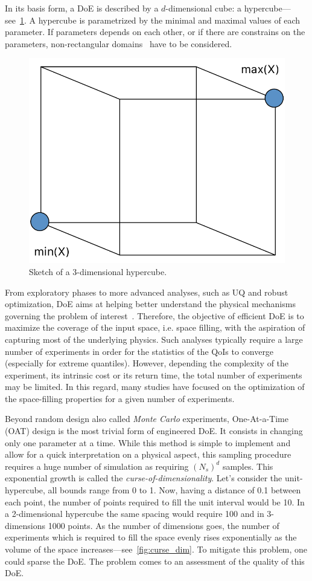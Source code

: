 In its basis form, a DoE is described by a $d$-dimensional cube: a hypercube---see~\cref{fig:sketch_hypercube}. A hypercube is parametrized by the minimal and maximal values of each parameter. If parameters depends on each other, or if there are constrains on the parameters, non-rectangular domains~\citep{Lekivetz2015} have to be considered.

\begin{figure}[!ht]
\centering
\includegraphics[width=0.5\linewidth,keepaspectratio]{fig/literature/hypercube.pdf}
\caption{Sketch of a 3-dimensional hypercube.}
\label{fig:sketch_hypercube}
\end{figure}

From exploratory phases to more advanced analyses, such as UQ and robust optimization, DoE aims at helping better understand the physical mechanisms governing the problem of interest~\citep{Saltelli2007}. Therefore, the objective of efficient DoE is to maximize the coverage of the input space, i.e. space filling, with the aspiration of capturing most of the underlying physics. Such analyses typically require a large number of experiments in order for the statistics of the QoIs to converge (especially for extreme quantiles). However, depending the complexity of the experiment, its intrinsic cost or its return time, the total number of experiments may be limited. In this regard, many studies have focused on the optimization of the space-filling properties for a given number of experiments.

Beyond random design also called \emph{Monte Carlo} experiments, One-At-a-Time (OAT) design is the most trivial form of engineered DoE. It consists in changing only one parameter at a time. While this method is simple to implement and allow for a quick interpretation on a physical aspect, this sampling procedure requires a huge number of simulation as requiring $(N_s)^d$ samples. This exponential growth is called the \emph{curse-of-dimensionality}. Let's consider the unit-hypercube, all bounds range from 0 to 1. Now, having a distance of 0.1 between each point, the number of points required to fill the unit interval would be 10. In a 2-dimensional hypercube the same spacing would require 100 and in 3-dimensions 1000 points. As the number of dimensions goes, the number of experiments which is required to fill the space evenly rises exponentially as the volume of the space increases---see~\cref{fig:curse_dim}. To mitigate this problem, one could sparse the DoE. The problem comes to an assessment of the quality of this DoE.

